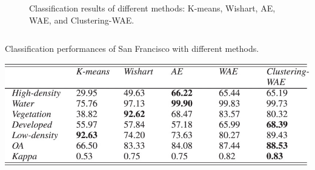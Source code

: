 \documentclass[10pt]{beamer}
\begin{document}
\begin{frame}
\begin{columns}
\begin{column}{0.5\textwidth}
\begin{figure}
\caption{Classification results of different methods: K-means, Wishart, AE, WAE, and Clustering-WAE.}
\label{fig:two}
\end{figure}
\end{column}
\end{columns}
\end{frame}

\begin{frame}
\begin{table}
  \caption{Classification performances of San Francisco with different methods.}
  \label{tab:one}
  \includegraphics[width=\linewidth]{table_5.jpg}
\end{table}
\end{frame}
\end{document}
